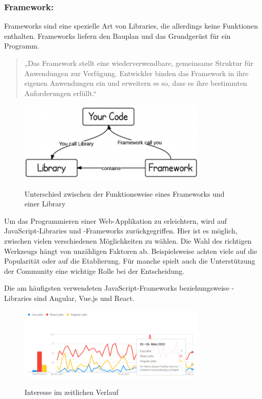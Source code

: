\subsubsection{Framework:}

Frameworks sind eine spezielle Art von Libraries, die allerdings keine Funktionen enthalten. Frameworks liefern den Bauplan und das Grundgerüst für ein Programm.

\cite{LibFramw}

\begin{quote}
  „Das Framework stellt eine wiederverwendbare, gemeinsame Struktur für Anwendungen zur Verfügung. Entwickler binden das Framework in ihre eigenen Anwendungen ein und erweitern es so, dass es ihre bestimmten Anforderungen erfüllt.“
\end{quote} \cite{framevsL2}

\begin{figure}[H]
  \centering
  \includegraphics[width=0.8\textwidth]{pics/LibraryFramework.png}
  \caption{Unterschied zwischen der Funktionsweise eines Frameworks und einer Library}
  \cite{LibFramwImage}
\end{figure}

Um das Programmieren einer Web-Applikation zu erleichtern, wird auf JavaScript-Libraries und -Frameworks zurückgegriffen. Hier ist es möglich, zwischen vielen verschiedenen Möglichkeiten zu wählen. Die Wahl des richtigen Werkzeugs hängt von unzähligen Faktoren ab. Beispielsweise achten viele auf die Popularität oder auf die Etablierung. Für manche spielt auch die Unterstützung der Community eine wichtige Rolle bei der Entscheidung.

Die am häufigsten verwendeten JavaScript-Frameworks beziehungsweise -Libraries sind Angular, Vue.js und React.
\cite{framevsL2}

\begin{figure}[H]
  \centering
  \includegraphics[width=0.8\textwidth]{pics/interesseFL.png}
  \caption{Interesse im zeitlichen Verlauf}
  \cite{InteresseGraph}
\end{figure}

